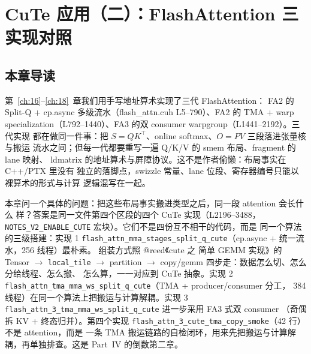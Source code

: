 \makeatletter
\providecommand{\urlchbrk}[1]{\@tfor\next:=#1\do{\next\allowbreak}}
\makeatother
\providecommand{\url}[1]{{\ttfamily\urlchbrk{#1}}}
\chapter{CuTe 应用（二）：FlashAttention 三实现对照}\label{ch:25}

\section{本章导读}

第~\ref{ch:16}--\ref{ch:18}~章我们用手写地址算术实现了三代 FlashAttention：
FA2 的 Split-Q + cp.async 多级流水（flash\_attn.cuh L5--790）、FA2 的 TMA + warp
specialization（L792--1440）、FA3 的双 consumer warpgroup（L1441--2192）。三代实现
都在做同一件事：把 $S=QK^\top$、online softmax、$O=PV$ 三段落进张量核与搬运
流水之间；但每一代都要重写一遍 Q/K/V 的 smem 布局、fragment 的 lane 映射、
ldmatrix 的地址算术与屏障协议。这不是作者偷懒：布局事实在 C++/PTX 里没有
独立的落脚点，swizzle 常量、lane 位段、寄存器编号只能以裸算术的形式与计算
逻辑混写在一起。

本章问一个具体的问题：把这些布局事实搬进类型之后，同一段 attention 会长什么
样？答案是同一文件第四个区段的四个 CuTe 实现（L2196--3488，
\texttt{NOTES\_\allowbreak{}V2\_\allowbreak{}ENABLE\_\allowbreak{}CUTE} 宏块）。它们不是四份互不相干的代码，而是
同一个算法的三级搭建：实现 1
\texttt{flash\_\allowbreak{}attn\_\allowbreak{}mma\_\allowbreak{}stages\_\allowbreak{}split\_\allowbreak{}q\_\allowbreak{}cute}（cp.async + 统一流水，256 线程）最朴素。
组装方式照 @reed《cute 之 简单 GEMM 实现》的 Tensor $\to$ \texttt{local\_tile}
$\to$ partition $\to$ copy/gemm 四步走：数据怎么切、怎么分给线程、怎么搬、
怎么算，一一对应到 CuTe 抽象。实现 2
\texttt{flash\_\allowbreak{}attn\_\allowbreak{}tma\_\allowbreak{}mma\_\allowbreak{}ws\_\allowbreak{}split\_\allowbreak{}q\_\allowbreak{}cute}（TMA + producer/consumer 分工，
384 线程）在同一个算法上把搬运与计算解耦。实现 3
\texttt{flash\_\allowbreak{}attn\_\allowbreak{}3\_\allowbreak{}tma\_\allowbreak{}mma\_\allowbreak{}ws\_\allowbreak{}split\_\allowbreak{}q\_\allowbreak{}cute} 进一步采用 FA3 式双 consumer
（奇偶拆 KV + 终态归并）。第四个实现
\texttt{flash\_\allowbreak{}attn\_\allowbreak{}3\_\allowbreak{}cute\_\allowbreak{}tma\_\allowbreak{}copy\_\allowbreak{}smoke}（42 行）不是 attention，而是
一条 TMA 搬运链路的自检闭环，用来先把搬运与计算解耦，再单独排查。这是
Part~IV 的倒数第二章。

